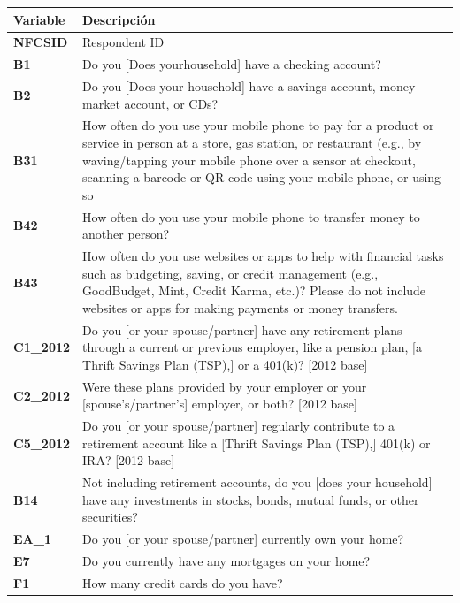 \documentclass[a4paper, 11pt]{article}
\begin{document}
\begin{table}
\centering
\begin{tabular}{>{\RaggedRight\hspace{0pt}}m{2cm} >{\RaggedRight\hspace{0pt}}m{11cm}}

\toprule
\textbf{Variable} & \textbf{Descripción} \\
\midrule

\textbf{NFCSID} & Respondent ID\\
\textbf{B1} & Do you [Does yourhousehold] have a checking account?  \\
\textbf{B2} & Do you [Does your household] have a savings account, money market account, or CDs?\\
\textbf{B31} & How often do you use your mobile phone to pay for a product or service in person at a store, gas station, or restaurant (e.g., by waving/tapping your mobile phone over a sensor at checkout, scanning a barcode or QR code using your mobile phone, or using so\\
\textbf{B42} & How often do you use your mobile phone to transfer money to another person?\\
\textbf{B43} & How often do you use websites or apps to help with financial tasks such as budgeting, saving, or credit management (e.g., GoodBudget, Mint, Credit Karma, etc.)? Please do not include websites or apps for making payments or money transfers.\\
\textbf{C1\_2012} & Do you [or your spouse/partner] have any retirement plans through a current or previous employer, like a pension plan, [a Thrift Savings Plan (TSP),] or a 401(k)? [2012 base] \\
\textbf{C2\_2012} & Were these plans provided by your employer or your [spouse's/partner's] employer, or both? [2012 base] \\
\textbf{C5\_2012} & Do you [or your spouse/partner] regularly contribute to a retirement account like a [Thrift Savings Plan (TSP),] 401(k) or IRA? [2012 base]\\
\textbf{B14} & Not including retirement accounts, do you [does your household] have any investments in stocks, bonds, mutual funds, or other securities? \\
\textbf{EA\_1} & Do you [or your spouse/partner] currently own your home?\\
\textbf{E7} & Do you currently have any mortgages on your home?\\
\textbf{F1} & How many credit cards do you have?\\

\end{tabular}
\end{table}
\end{document}
